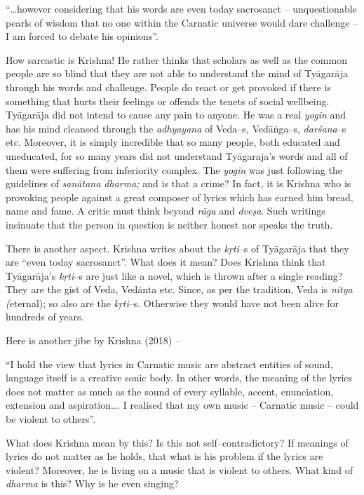 \begin{myquote}
“…however considering that his words are even today sacrosanct – unquestionable pearls of wisdom that no one within the Carnatic universe would dare challenge – I am forced to debate his opinions”.
\end{myquote}

How sarcastic is Krishna! He rather thinks that scholars as well as the common people are so blind that they are not able to understand the mind of Tyāgarāja through his words and challenge. People do react or get provoked if there is something that hurts their feelings or offends the tenets of social wellbeing. Tyāgarāja did not intend to cause any pain to anyone. He was a real \textit{yogin} and has his mind cleansed through the \textit{adhyayana} of Veda–s, Vedāṅga–s, \textit{darśana}–s etc. Moreover, it is simply incredible that so many people, both educated and uneducated, for so many years did not understand Tyāgaraja’s words and all of them were suffering from inferiority complex. The \textit{yogin} was just following the guidelines of \textit{sanātana dharma;} and is that a crime? In fact, it is Krishna who is provoking people against a great composer of lyrics which has earned him bread, name and fame. A critic must think beyond \textit{rāga} and \textit{dveṣa}. Such writings insinuate that the person in question is neither honest nor speaks the truth. 

There is another aspect. Krishna writes about the \textit{kṛti}–s of Tyāgarāja that they are “even today sacrosanct”. What does it mean? Does Krishna think that Tyāgarāja’s \textit{kṛti}–s are just like a novel, which is thrown after a single reading? They are the gist of Veda, Vedānta etc. Since, as per the tradition, Veda is \textit{nitya (}eternal); so also are the \textit{kṛti}–s. Otherwise they would have not been alive for hundreds of years. 

Here is another jibe by Krishna (2018) –

\begin{myquote}
“I hold the view that lyrics in Carnatic music are abstract entities of sound, language itself is a creative sonic body. In other words, the meaning of the lyrics does not matter as much as the sound of every syllable, accent, enunciation, extension and aspiration…. I realised that my own music – Carnatic music – could be violent to others”.
\end{myquote}

What does Krishna mean by this? Is this not self–contradictory? If meanings of lyrics do not matter as he holds, that what is his problem if the lyrics are violent? Moreover, he is living on a music that is violent to others. What kind of \textit{dharma} is this? Why is he even singing?

